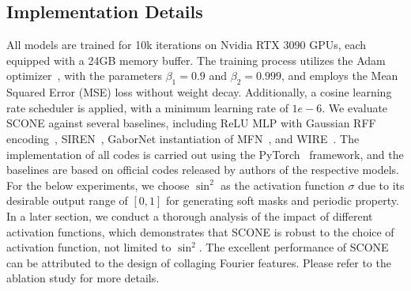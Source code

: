 \documentclass[letterpaper]{article} %
\newcommand{\note}{\textcolor{red}}
\begin{document}
\subsection{Implementation Details}
All models are trained for 10k iterations on Nvidia RTX 3090 GPUs, each equipped with a 24GB memory buffer. The training process utilizes the Adam optimizer~\cite{kingma2014adam}, with the parameters $\beta_1 = 0.9$ and $\beta_2 = 0.999$, and employs the Mean Squared Error (MSE) loss without weight decay. Additionally, a cosine learning rate scheduler is applied, with a minimum learning rate of $1e-6$. We evaluate SCONE against several baselines, including ReLU MLP with Gaussian RFF encoding~\cite{tancik2020fourier}, SIREN~\cite{2020siren}, GaborNet instantiation of MFN~\cite{fathony2020multiplicative}, and WIRE~\cite{saragadam2023wire}. The implementation of all codes is carried out using the PyTorch~\cite{pytorch} framework, and the baselines are based on official codes released by authors of the respective models. For the below experiments, we choose $\sin^2$ as the activation function $\sigma$ due to its desirable output range of $[0,1]$ for generating soft masks and periodic property. In a later section, we conduct a thorough analysis of the impact of different activation functions, which demonstrates that SCONE is robust to the choice of activation function, not limited to $\sin^2$. The excellent performance of SCONE can be attributed to the design of collaging Fourier features. Please refer to the ablation study for more details.

\end{document}
